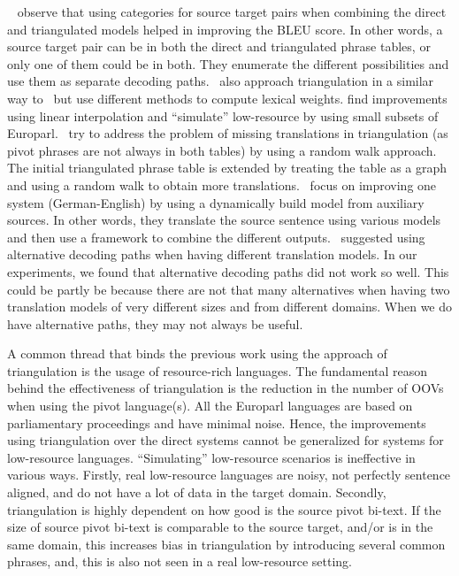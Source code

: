 \documentclass[11pt]{article}
\begin{document}
~\cite{Habash:13} observe that using categories for source target pairs when combining the direct and triangulated models helped in improving the BLEU score. In other words, a source target pair can be in both the direct and triangulated phrase tables, or only one of them could be in both. They enumerate the different possibilities and use them as separate decoding paths.~\cite{Wuwang:07} also approach triangulation in a similar way to~\cite{Cohn:07} but use different methods to compute lexical weights.\cite{Cohn:07} find improvements using linear interpolation and ``simulate'' low-resource by using small subsets of Europarl.~\cite{zhu:2013} try to address the problem of missing translations in triangulation (as pivot phrases are not always in both tables) by using a random walk approach. The initial triangulated phrase table is extended by treating the table as a graph and using a random walk to obtain more translations.~\cite{crego:10} focus on improving one system (German-English) by using a dynamically build model from auxiliary sources. In other words, they translate the source sentence using various models and then use a framework to combine the different outputs.~\cite{Bertoldi:08} suggested using alternative decoding paths when having different translation models. In our experiments, we found that alternative decoding paths did not work so well. This could be partly be because there are not that many alternatives when having two translation models of very different sizes and from different domains. When we do have alternative paths, they may not always be useful.  

 
A common thread that binds the previous work using the approach of triangulation is the usage of resource-rich languages. The fundamental reason behind the effectiveness of triangulation is the reduction in the number of OOVs when using the pivot language(s). All the Europarl languages are based on parliamentary proceedings and have minimal noise. Hence, the improvements using triangulation over the direct systems cannot be generalized for systems for low-resource languages. ``Simulating'' low-resource scenarios is ineffective in various ways. Firstly, real low-resource languages are noisy, not perfectly sentence aligned, and do not have a lot of data in the target domain. Secondly, triangulation is highly dependent on how good is the source pivot bi-text. If the size of source pivot bi-text is comparable to the source target, and/or is in the same domain, this increases bias in triangulation by introducing several common phrases, and, this is also not seen in a real low-resource setting.
\end{document}
